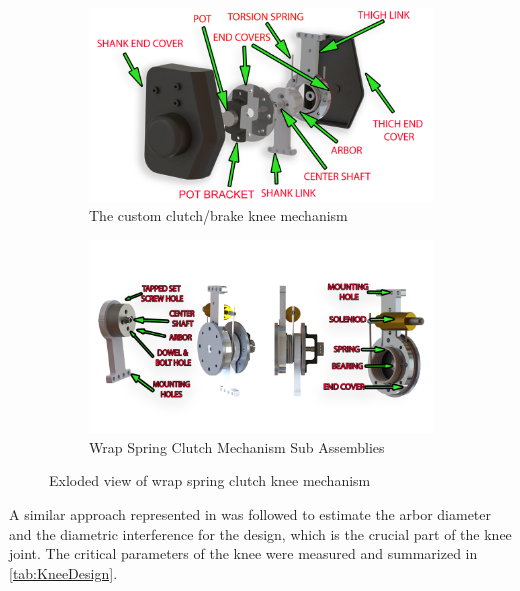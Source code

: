 \begin{figure}
    \begin{subfigure}{\textwidth}
        \centering
        \captionsetup{justification=centering}
        \centerline{
        \includegraphics[scale=0.16]{images/mech_design/knee exploded view_edit2.png}}
        \caption[Custom Knee Mechanism]{The custom clutch/brake knee mechanism}
        \label{fig:kneemechASM}
    \end{subfigure}
    \begin{subfigure}{\textwidth}
        \centering
        \captionsetup{justification=centering}
        \centerline{
        \includegraphics[scale=0.3]{images/mech_design/all_knee.png}}
        \caption[Wrap Spring Clutch Mechanism]{Wrap Spring Clutch Mechanism Sub Assemblies}
        \label{fig:subknee}
    \end{subfigure}    
    \caption{Exloded view of wrap spring clutch knee mechanism}
    \label{fig:kneemech}
\end{figure}

A similar approach represented in \cite{tung2013design} was followed to estimate the arbor diameter and the diametric interference for the design, which is the crucial part of the knee joint. The critical parameters of the knee were measured and summarized in \autoref{tab:KneeDesign}.


